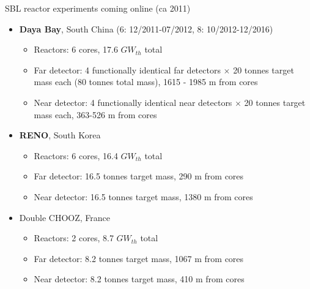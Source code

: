 \begin{frame}{SBL reactor experiments coming online (ca 2011)}

\begin{itemize}
  \item {\bf Daya Bay}, South China (6: 12/2011-07/2012, 8: 10/2012-12/2016)
     \begin{itemize}
        \item Reactors: 6 cores, 17.6 $GW_{th}$ total
        \item Far detector: 4 functionally identical far detectors $\times$ 20 tonnes target mass each
                 (80 tonnes total mass),
                 1615 - 1985 m from cores
        \item Near detector: 4 functionally identical near detectors $\times$ 20 tonnes target mass each,
                 363-526 m from cores
     \end{itemize}
  \item {\bf RENO}, South Korea %
     \begin{itemize}
       \item Reactors: 6 cores, 16.4 $GW_{th}$ total
       \item Far detector: 16.5 tonnes target mass, 290 m from cores
       \item Near detector: 16.5 tonnes target mass, 1380 m from cores
     \end{itemize}
  \item Double CHOOZ, France
     \begin{itemize}
        \item Reactors: 2 cores, 8.7 $GW_{th}$ total
        \item Far detector: 8.2 tonnes target mass, 1067 m from cores
        \item Near detector: 8.2 tonnes target mass, 410 m from cores
     \end{itemize}
\end{itemize}

\end{frame}


